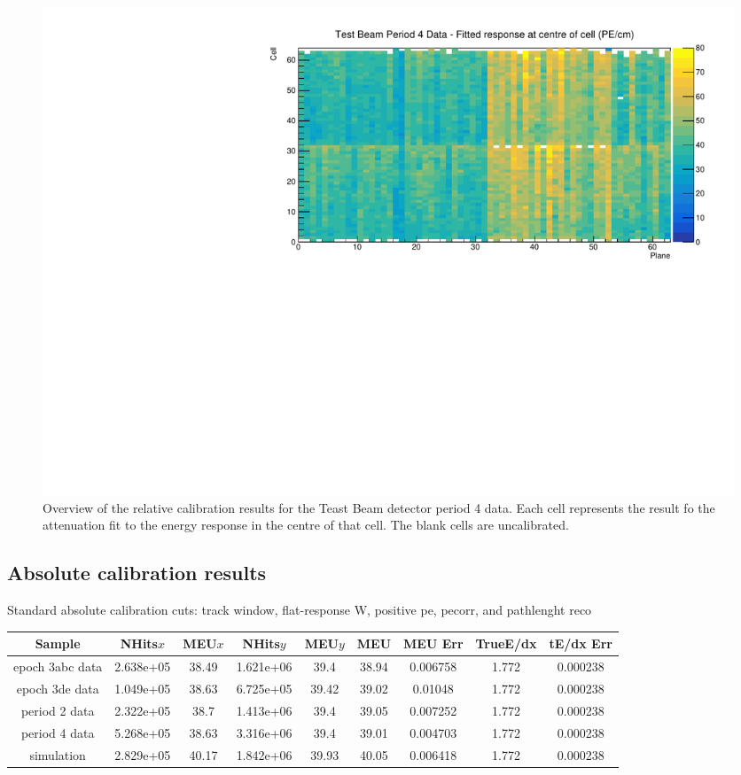 \documentclass[12pt,a4paper]{article}
\begin{document}
\begin{figure}[!hbtp]
\centering
\includegraphics[width=\textwidth]{Plots/CellResponseAtCentre_period4_Limited.pdf}
\caption{Overview of the relative calibration results for the Teast Beam detector period 4 data. Each cell represents the result fo the attenuation fit to the energy response in the centre of that cell. The blank cells are uncalibrated.}
\end{figure}


\subsection{Absolute calibration results}

Standard absolute calibration cuts: track window, flat-response W, positive pe, pecorr, and pathlenght reco\begin{center}
\begin{table}[h!]
\begin{tabular}{ |c|c|c|c|c|c|c|c|c|}

\hline
Sample & NHits$ x$ & MEU$ x$ & NHits$ y$ & MEU$ y$ & MEU & MEU Err & TrueE/dx & tE/dx Err\\ \hline
epoch 3abc data & 2.638e+05 & 38.49 & 1.621e+06 & 39.4 & 38.94 & 0.006758 & 1.772 & 0.000238\\ \hline
epoch 3de data & 1.049e+05 & 38.63 & 6.725e+05 & 39.42 & 39.02 & 0.01048 & 1.772 & 0.000238\\ \hline
period 2 data & 2.322e+05 & 38.7 & 1.413e+06 & 39.4 & 39.05 & 0.007252 & 1.772 & 0.000238\\ \hline
period 4 data & 5.268e+05 & 38.63 & 3.316e+06 & 39.4 & 39.01 & 0.004703 & 1.772 & 0.000238\\ \hline
simulation & 2.829e+05 & 40.17 & 1.842e+06 & 39.93 & 40.05 & 0.006418 & 1.772 & 0.000238\\ \hline
\end{tabular}
\label{tab:calib_summary_table}
\end{table}
\end{center}
\end{document}
